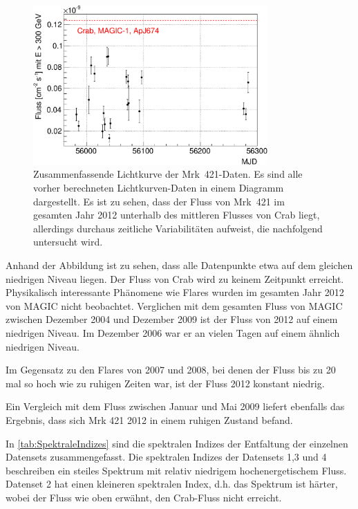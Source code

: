 \begin{figure}
    \centering
    \includegraphics[width=0.8\textwidth]{./Plots/04_MrkAnalyse/Alles_LC.pdf}
    \caption{Zusammenfassende Lichtkurve der Mrk~421-Daten.
    Es sind alle vorher berechneten Lichtkurven-Daten in einem Diagramm dargestellt. 
    Es ist zu sehen, dass der Fluss von Mrk~421 im gesamten Jahr 2012 unterhalb des mittleren Flusses von Crab liegt, allerdings durchaus zeitliche Variabilitäten aufweist, die nachfolgend untersucht wird.}
    \label{Alles_LC_Mrk421}
\end{figure}

Anhand der Abbildung ist zu sehen, dass alle Datenpunkte etwa auf dem gleichen niedrigen Niveau liegen.
Der Fluss von Crab wird zu keinem Zeitpunkt erreicht.
Physikalisch interessante Phänomene wie Flares wurden im gesamten Jahr 2012 von MAGIC nicht beobachtet.
Verglichen mit dem gesamten Fluss von MAGIC zwischen Dezember 2004 und Dezember 2009 \cite{DissBackes} ist der Fluss von 2012 auf einem niedrigen Niveau.
Im Dezember 2006 war er an vielen Tagen auf einem ähnlich niedrigen Niveau.

Im Gegensatz zu den Flares von 2007 und 2008, bei denen der Fluss bis zu 20 mal so hoch wie zu ruhigen Zeiten \cite{DissBackes}  war, ist der Fluss 2012 konstant niedrig.

Ein Vergleich mit dem Fluss zwischen Januar und Mai 2009 \cite{DissDiego} liefert ebenfalls das Ergebnis, dass sich Mrk 421 2012 in einem ruhigen Zustand befand.

In \autoref{tab:SpektraleIndizes} sind die spektralen Indizes der Entfaltung der einzelnen Datensets zusammengefasst.
Die spektralen Indizes der Datensets 1,3 und 4 beschreiben ein steiles Spektrum mit relativ niedrigem hochenergetischem Fluss.
Datenset 2 hat einen kleineren spektralen Index, d.h. das Spektrum ist härter, wobei der Fluss wie oben erwähnt, den Crab-Fluss nicht erreicht.


